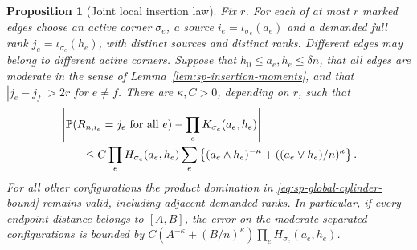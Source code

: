 \documentclass[11pt]{article}
\newtheorem{proposition}[theorem]{Proposition}
\theoremstyle{remark}
\theoremstyle{plain}
\newcommand{\Pp}{\mathbb P}
\begin{document}
\begin{proposition}[Joint local insertion law]\label{prop:sp-joint-insertion}
Fix $r$.  For each of at most $r$ marked edges choose an active corner
$\sigma_e$, a source $i_e=\iota_{\sigma_e}(a_e)$ and a demanded full rank
$j_e=\iota_{\sigma_e}(h_e)$, with distinct sources and distinct ranks.
Different edges may belong to different active corners.  Suppose that
$h_0\le a_e,h_e\le\delta n$, that all edges are moderate in the sense of
Lemma~\ref{lem:sp-insertion-moments}, and that $|j_e-j_f|>2r$ for $e\ne f$.
There are $\kappa,C>0$, depending on $r$, such that
\begin{align}
 &\left|\Pp(R_{n,i_e}=j_e\text{ for all }e)
                   -\prod_eK_{\sigma_e}(a_e,h_e)\right|\notag\\
 &\qquad\le C\prod_eH_{\sigma_e}(a_e,h_e)
   \sum_e\left\{(a_e\wedge h_e)^{-\kappa}
                   +((a_e\vee h_e)/n)^\kappa\right\}.
 \label{eq:sp-joint-insertion-error}
\end{align}
For all other configurations the product domination in
\eqref{eq:sp-global-cylinder-bound} remains valid, including adjacent
demanded ranks.  In particular, if every endpoint distance belongs to
$[A,B]$, the error on the moderate separated configurations is bounded by
$C(A^{-\kappa}+(B/n)^\kappa)\prod_eH_{\sigma_e}(a_e,h_e)$.
\end{proposition}
\end{document}
